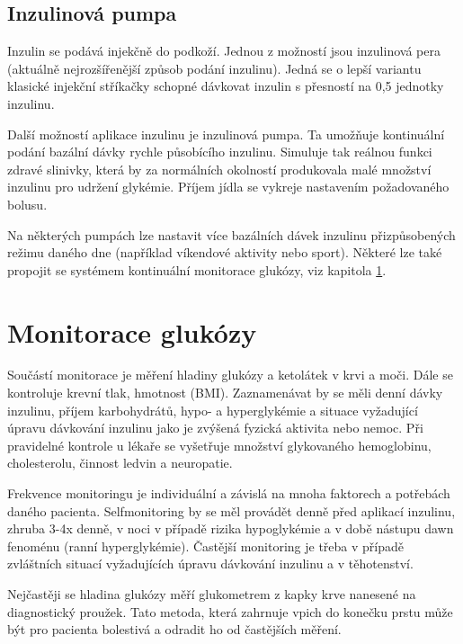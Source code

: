 \subsection{Inzulinová pumpa}
\label{ch:pumpa}

Inzulin se podává injekčně do podkoží. Jednou z možností jsou inzulinová pera (aktuálně nejrozšířenější způsob podání inzulinu). Jedná se o lepší variantu klasické injekční stříkačky schopné dávkovat inzulin s přesností na 0,5 jednotky inzulinu.

Další možností aplikace inzulinu je inzulinová pumpa. Ta umožňuje kontinuální podání bazální dávky rychle působícího inzulinu. Simuluje tak reálnou funkci zdravé slinivky, která by za normálních okolností produkovala malé množství inzulinu pro udržení glykémie. Příjem jídla se vykreje nastavením požadovaného bolusu.

Na některých pumpách lze nastavit více bazálních dávek inzulinu přizpůsobených režimu daného dne (například víkendové aktivity nebo sport). Některé lze také propojit se systémem kontinuální monitorace glukózy, viz kapitola \ref{ch:monitorace}. \cite{Diabetes.Perusicova,Diabetes.Rybka} 


\section{Monitorace glukózy}
\label{ch:monitorace}

Součástí monitorace je měření hladiny glukózy a ketolátek v krvi a moči. Dále se kontroluje krevní tlak, hmotnost (BMI). Zaznamenávat by se měli denní dávky inzulinu, příjem karbohydrátů, hypo- a hyperglykémie a situace vyžadující úpravu dávkování inzulinu jako je zvýšená fyzická aktivita nebo nemoc. Při pravidelné kontrole u lékaře se vyšetřuje množství glykovaného hemoglobinu, cholesterolu, činnost ledvin a neuropatie.

Frekvence monitoringu je individuální a závislá na mnoha faktorech a potřebách daného pacienta. Selfmonitoring by se měl provádět denně před aplikací inzulinu, zhruba 3-4x denně, v noci v případě rizika hypoglykémie a v době nástupu dawn fenoménu (ranní hyperglykémie). Častější monitoring je třeba v případě zvláštních situací vyžadujících úpravu dávkování inzulinu a v těhotenství.

Nejčastěji se hladina glukózy měří glukometrem z kapky krve nanesené na diagnostický proužek. Tato metoda, která zahrnuje vpich do konečku prstu může být pro pacienta bolestivá a odradit ho od častějších měření. \cite{Diabetes.Pelikan}

